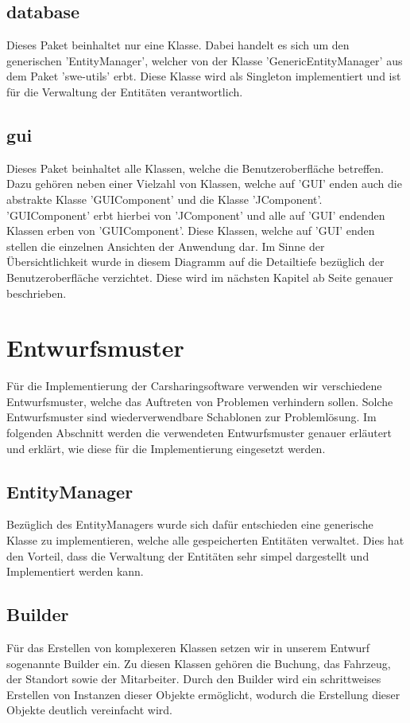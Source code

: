 \subsection{database}
Dieses Paket beinhaltet nur eine Klasse. Dabei handelt es sich um den generischen 'EntityManager', welcher von der Klasse 'GenericEntityManager' aus dem Paket 'swe-utils' erbt. Diese Klasse wird als Singleton implementiert und ist für die Verwaltung der Entitäten verantwortlich.

\subsection{gui}
Dieses Paket beinhaltet alle Klassen, welche die Benutzeroberfläche betreffen. Dazu gehören neben einer Vielzahl von Klassen, welche auf 'GUI' enden auch die abstrakte Klasse 'GUIComponent' und die Klasse 'JComponent'. 'GUIComponent' erbt hierbei von 'JComponent' und alle auf 'GUI' endenden Klassen erben von 'GUIComponent'. Diese Klassen, welche auf 'GUI' enden stellen die einzelnen Ansichten der Anwendung dar. Im Sinne der Übersichtlichkeit wurde in diesem Diagramm auf die Detailtiefe bezüglich der Benutzeroberfläche verzichtet. Diese wird im nächsten Kapitel ab Seite \pageref{chapter:gui} genauer beschrieben.

\section{Entwurfsmuster}
Für die Implementierung der Carsharingsoftware verwenden wir verschiedene Entwurfsmuster, welche das Auftreten von Problemen verhindern sollen. Solche Entwurfsmuster sind wiederverwendbare Schablonen zur Problemlösung. Im folgenden Abschnitt werden die verwendeten Entwurfsmuster genauer erläutert und erklärt, wie diese für die Implementierung eingesetzt werden. 

\subsection{EntityManager}
Bezüglich des EntityManagers wurde sich dafür entschieden eine generische Klasse zu implementieren, welche alle gespeicherten Entitäten verwaltet. Dies hat den Vorteil, dass die Verwaltung der Entitäten sehr simpel dargestellt und Implementiert werden kann.

\subsection{Builder}
Für das Erstellen von komplexeren Klassen setzen wir in unserem Entwurf sogenannte Builder ein. Zu diesen Klassen gehören die Buchung, das Fahrzeug, der Standort sowie der Mitarbeiter. Durch den Builder wird ein schrittweises Erstellen von Instanzen dieser Objekte ermöglicht, wodurch die Erstellung dieser Objekte deutlich vereinfacht wird.

